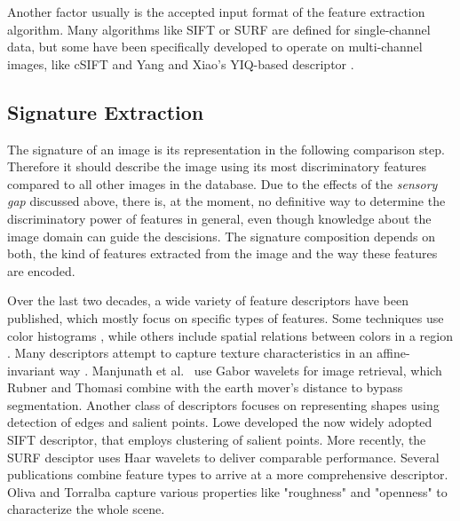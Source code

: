 Another factor usually is the accepted input format of the feature extraction
algorithm. Many algorithms like SIFT \autocite{lowe_object_1999} or SURF
\autocite{bay_speeded-up_2008} are defined for single-channel data, but some
have been specifically developed to operate on multi-channel images, like cSIFT
\autocite{abdel-hakim_csift:_2006} and Yang and Xiao's YIQ-based descriptor
\autocite{yang_robust_2008}.

\subsection{Signature Extraction}\label{sec:anatomy_signature_extraction}

The signature of an image is its representation in the following comparison
step. Therefore it should describe the image using its most discriminatory
features compared to all other images in the database. Due to the effects of
the \emph{sensory gap} discussed above, there is, at the moment, no definitive
way to determine the discriminatory power of features in general, even though
knowledge about the image domain can guide the descisions.  The signature
composition depends on both, the kind of features extracted from the image and
the way these features are encoded. 

Over the last two decades, a wide variety of feature descriptors have been
published, which mostly focus on specific types of features. Some techniques
use color histograms \autocite{utenpattanant_color_2006}, while others include
spatial relations between colors in a region \autocite{stricker_color_1996}
\autocite{deng_efficient_2001} \autocite{lee_spatial_2003}.
Many descriptors attempt to capture texture characteristics in an
affine-invariant way \autocite{schaffalitzky_viewpoint_2001}. Manjunath et al.\
\autocite{manjunath_texture_1996} use Gabor wavelets for image retrieval, which
Rubner and Thomasi \autocite{rubner_texture-based_1999} combine with the earth
mover's distance to bypass segmentation.
Another class of descriptors focuses on representing shapes using detection of
edges and salient points. Lowe \autocite{lowe_object_1999} developed the now
widely adopted SIFT descriptor, that employs clustering of salient points. More
recently, the SURF desciptor \autocite{bay_speeded-up_2008} uses Haar wavelets
to deliver comparable performance.
Several publications combine feature types to arrive at a more comprehensive
descriptor. Oliva and Torralba \autocite{oliva_modeling_2001} capture various
properties like "roughness" and "openness" to characterize the whole scene.

